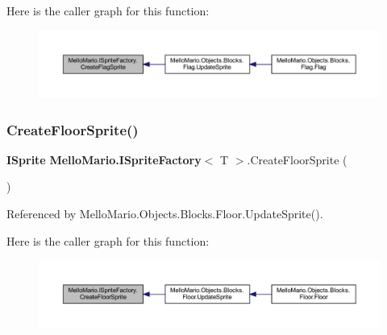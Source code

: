 Here is the caller graph for this function\+:
\nopagebreak
\begin{figure}[H]
\begin{center}
\leavevmode
\includegraphics[width=350pt]{interfaceMelloMario_1_1ISpriteFactory_a65b0d7c27925a037beb2d5f28225d2b7_icgraph}
\end{center}
\end{figure}
\mbox{\label{interfaceMelloMario_1_1ISpriteFactory_a49654e8529c34a20138d20aed364f8d7}} 
\subsubsection{Create\+Floor\+Sprite()}
{\footnotesize\ttfamily \textbf{ I\+Sprite} \textbf{ Mello\+Mario.\+I\+Sprite\+Factory}$<$ T $>$.Create\+Floor\+Sprite (\begin{DoxyParamCaption}{ }\end{DoxyParamCaption})}



Referenced by Mello\+Mario.\+Objects.\+Blocks.\+Floor.\+Update\+Sprite().

Here is the caller graph for this function\+:
\nopagebreak
\begin{figure}[H]
\begin{center}
\leavevmode
\includegraphics[width=350pt]{interfaceMelloMario_1_1ISpriteFactory_a49654e8529c34a20138d20aed364f8d7_icgraph}
\end{center}
\end{figure}
\mbox{\label{interfaceMelloMario_1_1ISpriteFactory_acbcfc2b85fb60239b6a77360ec4e5293}} 
